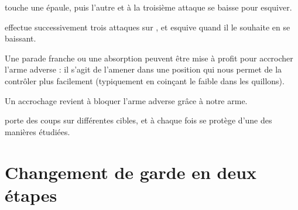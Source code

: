 \begin{exercice}

	\A touche une épaule, puis l'autre et à la troisième attaque \D se baisse pour esquiver.
\end{exercice}


\begin{exercice}


	\A effectue successivement trois attaques sur \D, et \D esquive quand il le souhaite en se baissant.
\end{exercice}


Une parade franche ou une absorption peuvent être mise à profit pour accrocher l'arme adverse : il s'agit de l'amener dans une position qui nous permet de la contrôler plus facilement (typiquement en coinçant le faible dans les quillons).


\begin{definition}[Accrochage]

	Un accrochage revient à bloquer l'arme adverse grâce à notre arme.
\end{definition}


\begin{exercice}

	\A porte des coups sur différentes cibles, et à chaque fois \D se protège d'une des manières étudiées.
\end{exercice}



\section{Changement de garde en deux étapes}


